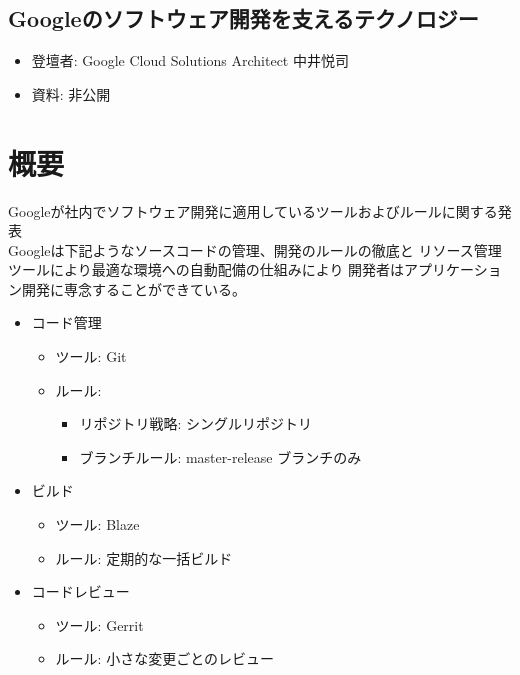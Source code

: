 \begin{center}
  \section*{Googleのソフトウェア開発を支えるテクノロジー}
\end{center}


\begin{flushright}
  \begin{itemize}
  \item   登壇者: Google Cloud Solutions Architect 中井悦司
  \item 資料: 非公開
  \end{itemize}
\end{flushright}

\section*{概要}
Googleが社内でソフトウェア開発に適用しているツールおよびルールに関する発表\\
Googleは下記ようなソースコードの管理、開発のルールの徹底と
リソース管理ツールにより最適な環境への自動配備の仕組みにより
開発者はアプリケーション開発に専念することができている。

\begin{itemize}

\item コード管理
  \begin{itemize}
  \item ツール: Git
  \item ルール:
    \begin{itemize}
    \item リポジトリ戦略: シングルリポジトリ
    \item ブランチルール: master-release ブランチのみ
    \end{itemize}
  \end{itemize}

\item ビルド
  \begin{itemize}
  \item ツール: Blaze
  \item ルール: 定期的な一括ビルド
  \end{itemize}

\item コードレビュー
  \begin{itemize}
  \item ツール: Gerrit
  \item ルール: 小さな変更ごとのレビュー
  \end{itemize}

\end{itemize}

